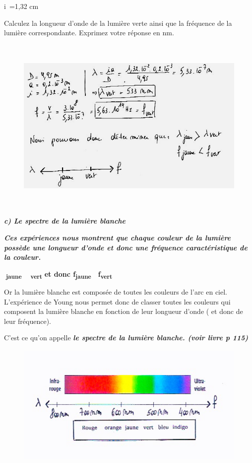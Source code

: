 i~=1,32 cm

Calculez la longueur d'onde de la lumière verte ainsi que la fréquence
de la lumière correspondante. Exprimez votre réponse en nm.

\begin{figure}
\centering
\includegraphics[width=15.833cm,height=8.654cm]{Pictures/100000010000023700000151168D50BCCC321003.png}
\caption{}
\end{figure}

\emph{\textbf{c) Le spectre de la lumière blanche}}

\emph{\textbf{Ces expériences nous montrent que chaque couleur de la
lumière possède une longueur d'onde et donc une fréquence
caractéristique de la couleur. }}

\textbf{}\textsubscript{\textbf{jaune}}\textbf{ 
}\textsubscript{\textbf{vert}}\textbf{ et donc
f}\textsubscript{\textbf{jaune}}\textbf{ 
f}\textsubscript{\textbf{vert}}

Or la lumière blanche est composée de toutes les couleurs de l'arc en
ciel. L'expérience de Young nous permet donc de classer toutes les
couleurs qui composent la lumière blanche en fonction de leur longueur
d'onde ( et donc de leur fréquence).

C'est ce qu'on appelle \emph{\textbf{le spectre de la lumière blanche.
(voir livre p 115)}}

\begin{figure}
\centering
\includegraphics[width=11.557cm,height=5.907cm]{Pictures/1000000100000186000000C7B42157D8D8096212.png}
\caption{}
\end{figure}


